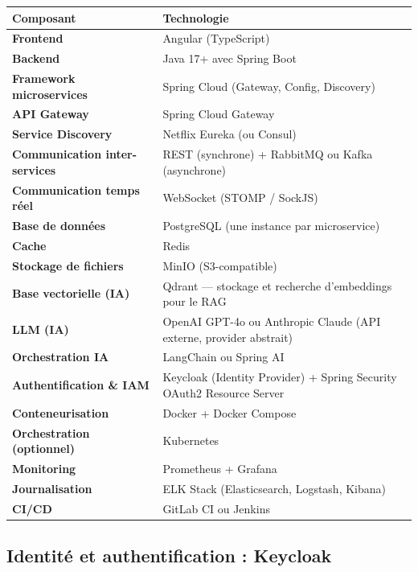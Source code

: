 \documentclass[12pt,a4paper]{article}
\begin{document}
\renewcommand{\arraystretch}{1.3}
\begin{longtable}{>{\bfseries\color{primary}}p{4cm} p{10cm}}
    \toprule
    \textbf{\color{primary}Composant} & \textbf{\color{primary}Technologie} \\
    \midrule
    \endhead

    Frontend & Angular (TypeScript) \\
    \rowcolor{lightgray}
    Backend & Java 17+ avec Spring Boot \\
    Framework microservices & Spring Cloud (Gateway, Config, Discovery) \\
    \rowcolor{lightgray}
    API Gateway & Spring Cloud Gateway \\
    Service Discovery & Netflix Eureka (ou Consul) \\
    \rowcolor{lightgray}
    Communication inter-services & REST (synchrone) + RabbitMQ ou Kafka (asynchrone) \\
    Communication temps réel & WebSocket (STOMP / SockJS) \\
    \rowcolor{lightgray}
    Base de données & PostgreSQL (une instance par microservice) \\
    Cache & Redis \\
    \rowcolor{lightgray}
    Stockage de fichiers & MinIO (S3-compatible) \\
    Base vectorielle (IA) & Qdrant --- stockage et recherche d'embeddings pour le RAG \\
    \rowcolor{lightgray}
    LLM (IA) & OpenAI GPT-4o ou Anthropic Claude (API externe, provider abstrait) \\
    Orchestration IA & LangChain ou Spring AI \\
    \rowcolor{lightgray}
    Authentification \& IAM & Keycloak (Identity Provider) + Spring Security OAuth2 Resource Server \\
    Conteneurisation & Docker + Docker Compose \\
    Orchestration (optionnel) & Kubernetes \\
    \rowcolor{lightgray}
    Monitoring & Prometheus + Grafana \\
    Journalisation & ELK Stack (Elasticsearch, Logstash, Kibana) \\
    \rowcolor{lightgray}
    CI/CD & GitLab CI ou Jenkins \\
    \bottomrule
\end{longtable}

\subsection{Identité et authentification : Keycloak}
\end{document}
